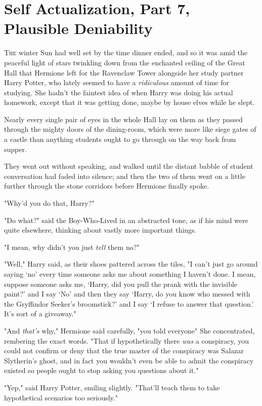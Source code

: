 \chapter{Self Actualization, Part 7, Plausible Deniability}

\lettrine{T}{he} winter Sun
had well set by the time dinner ended, and so it was amid the peaceful light of
stars twinkling down from the enchanted ceiling of the Great Hall that Hermione
left for the Ravenclaw Tower alongside her study partner Harry Potter, who
lately seemed to have a \emph{ridiculous} amount of time for studying. She
hadn't the faintest idea of when Harry was doing his actual homework, except
that it was getting done, maybe by house elves while he slept.

Nearly every single pair of eyes in the whole Hall lay on them as they passed
through the mighty doors of the dining-room, which were more like siege gates
of a castle than anything students ought to go through on the way back from
supper.

They went out without speaking, and walked until the distant babble of student
conversation had faded into silence; and then the two of them went on a little
further through the stone corridors before Hermione finally spoke.

"Why'd you do that, Harry?"

"Do what?" said the Boy-Who-Lived in an abstracted tone, as if his mind were
quite elsewhere, thinking about vastly more important things.

"I mean, why didn't you just \emph{tell} them no?"

"Well," Harry said, as their shoes pattered across the tiles, "I can't just go
around saying `no' every time someone asks me about something I haven't done. I
mean, suppose someone asks me, `Harry, did you pull the prank with the
invisible paint?' and I say `No' and then they say `Harry, do you know who
messed with the Gryffindor Seeker's broomstick?' and I say `I refuse to answer
that question.' It's sort of a giveaway."

"And \emph{that's} why," Hermione said carefully, "you told everyone{\el}"
She concentrated, rembering the exact words. "That if hypothetically there
\emph{was} a conspiracy, you could not confirm or deny that the true master of
the conspiracy was Salazar Slytherin's ghost, and in fact you wouldn't even be
able to admit the conspiracy existed so people ought to stop asking you
questions about it."

"Yep," said Harry Potter, smiling slightly. "That'll teach them to take
hypothetical scenarios too seriously."

